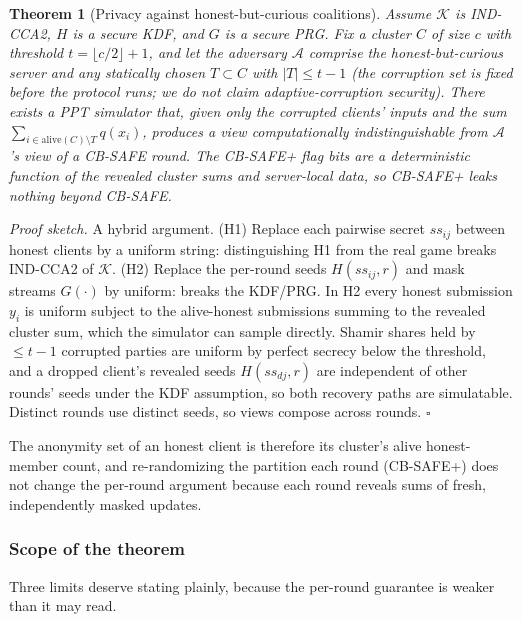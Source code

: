 \documentclass[lettersize,journal]{IEEEtran}
\newtheorem{theorem}{Theorem}
\begin{document}
\begin{theorem}[Privacy against honest-but-curious coalitions]\label{thm:priv}
Assume $\mathcal{K}$ is IND-CCA2, $H$ is a secure KDF, and $G$ is a secure PRG. Fix
a cluster $C$ of size $c$ with threshold $t=\lfloor c/2\rfloor+1$, and let the
adversary $\mathcal{A}$ comprise the honest-but-curious server and any statically
chosen $T \subset C$ with $|T| \le t-1$ (the corruption set is fixed before the
protocol runs; we do not claim adaptive-corruption security). There exists a PPT simulator that, given only the corrupted
clients' inputs and the sum $\sum_{i \in \mathrm{alive}(C)\setminus T} q(x_i)$,
produces a view computationally indistinguishable from $\mathcal{A}$'s view of a
CB-SAFE round. The CB-SAFE+ flag bits are a deterministic function of the revealed
cluster sums and server-local data, so CB-SAFE+ leaks nothing beyond CB-SAFE.
\end{theorem}

\emph{Proof sketch.} A hybrid argument. (H1) Replace each pairwise secret $ss_{ij}$
between honest clients by a uniform string: distinguishing H1 from the real game
breaks IND-CCA2 of $\mathcal{K}$. (H2) Replace the per-round seeds $H(ss_{ij},r)$
and mask streams $G(\cdot)$ by uniform: breaks the KDF/PRG. In H2 every honest
submission $y_i$ is uniform subject to the alive-honest submissions summing to the
revealed cluster sum, which the simulator can sample directly. Shamir shares held by
$\le t-1$ corrupted parties are uniform by perfect secrecy below the threshold, and
a dropped client's revealed seeds $H(ss_{dj}, r)$ are independent of other rounds'
seeds under the KDF assumption, so both recovery paths are simulatable. Distinct
rounds use distinct seeds, so views compose across rounds. \hfill$\square$

The anonymity set of an honest client is therefore its cluster's alive honest-member
count, and re-randomizing the partition each round (CB-SAFE+) does not change the
per-round argument because each round reveals sums of fresh, independently masked
updates.

\subsubsection{Scope of the theorem} Three limits deserve stating plainly,
because the per-round guarantee is weaker than it may read.
\end{document}
